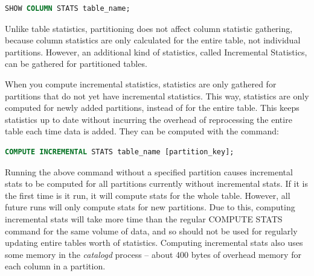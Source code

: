 \documentclass[onecolumn, draftclsnofoot,10pt, compsoc]{IEEEtran}
\begin{document}
    \begin{center}
    \begin{lstlisting}[language=SQL]
SHOW COLUMN STATS table_name;
\end{lstlisting}
\end{center}

Unlike table statistics, partitioning does not affect column statistic gathering, because column statistics are only calculated for the entire table, not individual partitions.
However, an additional kind of statistics, called Incremental Statistics, can be gathered for partitioned tables. 

When you compute incremental statistics, statistics are only gathered for partitions that do not yet have incremental statistics. This way, statistics are only computed for newly added partitions, instead of for the entire table. This keeps statistics up to date without incurring the overhead of reprocessing the entire table each time data is added. They can be computed with the command:

    \begin{center}
    \begin{lstlisting}[language=SQL]
COMPUTE INCREMENTAL STATS table_name [partition_key];
\end{lstlisting}
\end{center}

Running the above command without a specified partition causes incremental stats to be computed for all partitions currently without incremental stats.
If it is the first time is it run, it will compute stats for the whole table. 
However, all future runs will only compute stats for new partitions.
Due to this, computing incremental stats will take more time than the regular COMPUTE STATS command for the same volume of data, and so should not be used for regularly updating entire tables worth of statistics. 
Computing incremental stats also uses some memory in the \textit{catalogd} process -- about 400 bytes of overhead memory for each column in a partition.
\end{document}
